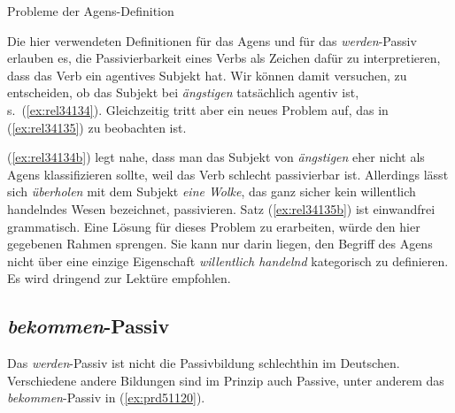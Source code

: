 \begin{Vertiefung}{Probleme der Agens-Definition}

  \label{vert:agensprobleme}

\noindent Die hier verwendeten Definitionen für das Agens und für das \textit{werden}-Passiv erlauben es, die Passivierbarkeit eines Verbs als Zeichen dafür zu interpretieren, dass das Verb ein agentives Subjekt hat.
Wir können damit versuchen, zu entscheiden, ob das Subjekt bei \textit{ängstigen} tatsächlich agentiv ist, s.\ (\ref{ex:rel34134}).
Gleichzeitig tritt aber ein neues Problem auf, das in (\ref{ex:rel34135}) zu beobachten ist.

\begin{exe}
  \ex\label{ex:rel34134} 
  \begin{xlist}
  \end{xlist}
  \ex\label{ex:rel34135} 
  \begin{xlist}
  \end{xlist}
\end{exe}

\Enl

(\ref{ex:rel34134b}) legt nahe, dass man das Subjekt von \textit{ängstigen} eher nicht als Agens klassifizieren sollte, weil das Verb schlecht passivierbar ist.
Allerdings lässt sich \textit{überholen} mit dem Subjekt \textit{eine Wolke}, das ganz sicher kein willentlich handelndes Wesen bezeichnet, passivieren.
Satz (\ref{ex:rel34135b}) ist einwandfrei grammatisch.
Eine Lösung für dieses Problem zu erarbeiten, würde den hier gegebenen Rahmen sprengen.
Sie kann nur darin liegen, den Begriff des Agens nicht über eine einzige Eigenschaft \textit{willentlich handelnd} kategorisch zu definieren.
Es wird dringend \citet{Dowty91} zur Lektüre empfohlen.

\end{Vertiefung}

\subsection{\textit{bekommen}-Passiv}

\label{sec:bekommenpassiv}

Das \textit{werden}-Passiv ist nicht die Passivbildung schlechthin im Deutschen.
Verschiedene andere Bildungen sind im Prinzip auch Passive, unter anderem das \textit{bekommen}-Passiv in (\ref{ex:prd51120}).

